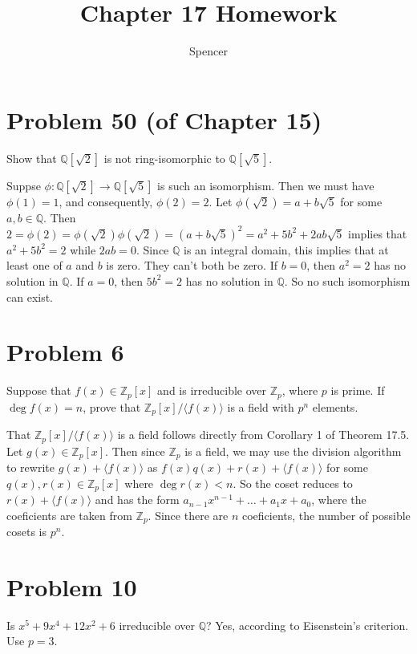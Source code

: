 \documentclass{article}
\title{Chapter 17 Homework}
\author{Spencer}
\begin{document}
\maketitle

\newcommand{\Z}{\mathbb{Z}}
\newcommand{\R}{\mathbb{R}}
\newcommand{\N}{\mathbb{N}}
\newcommand{\Q}{\mathbb{Q}}
\newcommand{\lcm}{\mbox{lcm}}

\section*{Problem 50 (of Chapter 15)}

Show that $\Q[\sqrt{2}]$ is not ring-isomorphic to $\Q[\sqrt{5}]$.

Suppse $\phi:\Q[\sqrt{2}]\to\Q[\sqrt{5}]$ is such an isomorphism.
Then we must have $\phi(1)=1$, and consequently, $\phi(2)=2$.
Let $\phi(\sqrt{2})=a+b\sqrt{5}$ for some $a,b\in\Q$.
Then $2=\phi(2)=\phi(\sqrt{2})\phi(\sqrt{2})=(a+b\sqrt{5})^2=a^2+5b^2+2ab\sqrt{5}$
implies that $a^2+5b^2=2$ while $2ab=0$.  Since $\Q$ is an integral domain, this
implies that at least one of $a$ and $b$ is zero.  They can't both be zero.  If $b=0$,
then $a^2=2$ has no solution in $\Q$.  If $a=0$, then $5b^2=2$ has no solution in $\Q$.
So no such isomorphism can exist.

\section*{Problem 6}

Suppose that $f(x)\in\Z_p[x]$ and is irreducible over $\Z_p$, where $p$ is prime.
If $\deg f(x)=n$, prove that $\Z_p[x]/\langle f(x)\rangle$ is a field with $p^n$ elements.

That $\Z_p[x]/\langle f(x)\rangle$ is a field follows directly from Corollary 1 of Theorem 17.5.
Let $g(x)\in\Z_p[x]$.
Then since $\Z_p$ is a field, we may use the division algorithm to rewrite $g(x)+\langle f(x)\rangle$
as $f(x)q(x)+r(x)+\langle f(x)\rangle$ for some $q(x),r(x)\in\Z_p[x]$ where $\deg r(x)<n$.
So the coset reduces to $r(x)+\langle f(x)\rangle$ and has the form $a_{n-1}x^{n-1}+\dots+a_1x+a_0$,
where the coeficients are taken from $\Z_p$.  Since there are $n$ coeficients, the number of possible
cosets is $p^n$.

\section*{Problem 10}

Is $x^5+9x^4+12x^2+6$ irreducible over $\Q$?
Yes, according to Eisenstein's criterion.  Use $p=3$.
\end{document}
